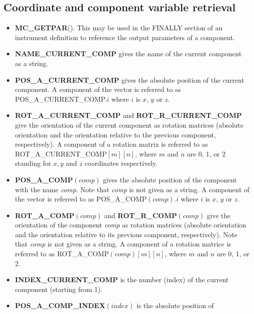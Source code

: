 \subsection{Coordinate and component variable retrieval}
\begin{itemize}
\item {\bf MC\_GETPAR}(). This may be used in the FINALLY section of an
  instrument definition to reference the output parameters of a
  component.
\item {\bf NAME\_CURRENT\_COMP} gives the name of the current component as a string.
\item {\bf POS\_A\_CURRENT\_COMP} gives the absolute position of the
  current component. A component of the vector is referred to as
  POS\_A\_CURRENT\_COMP.$i$ where $i$ is $x$, $y$ or $z$.
\item {\bf ROT\_A\_CURRENT\_COMP} and
  {\bf ROT\_R\_CURRENT\_COMP} give the orientation
  of the current component as rotation matrices
  (absolute orientation and the orientation relative to
  the previous component, respectively). A
  component of a rotation matrix is referred to as
  ROT\_A\_CURRENT\_COMP$[m][n]$, where $m$ and
  $n$ are 0, 1, or 2 standing for $x,y$ and $z$ coordinates respectively.
\item {\bf POS\_A\_COMP}$(comp)$ gives the absolute position
  of the component with the name {\em comp}. Note that
  {\em comp} is not given as a string. A component of the
  vector is referred to as POS\_A\_COMP$(comp).i$
  where $i$ is $x$, $y$ or $z$.
\item {\bf ROT\_A\_COMP}$(comp)$ and
  {\bf ROT\_R\_COMP}$(comp)$ give the orientation of the
  component {\em comp} as rotation matrices (absolute
  orientation and the orientation relative to its
  previous component, respectively). Note that {\em comp}
  is not given as a string. A component of  a rotation
  matrice is referred to as
  ROT\_A\_COMP$(comp)[m][n]$, where $m$ and $n$ are
  0, 1, or 2.
\item {\bf INDEX\_CURRENT\_COMP} is the number (index) of the
       current component  (starting from 1).
\item {\bf POS\_A\_COMP\_INDEX}$(index)$ is the absolute position of

\end{itemize}
